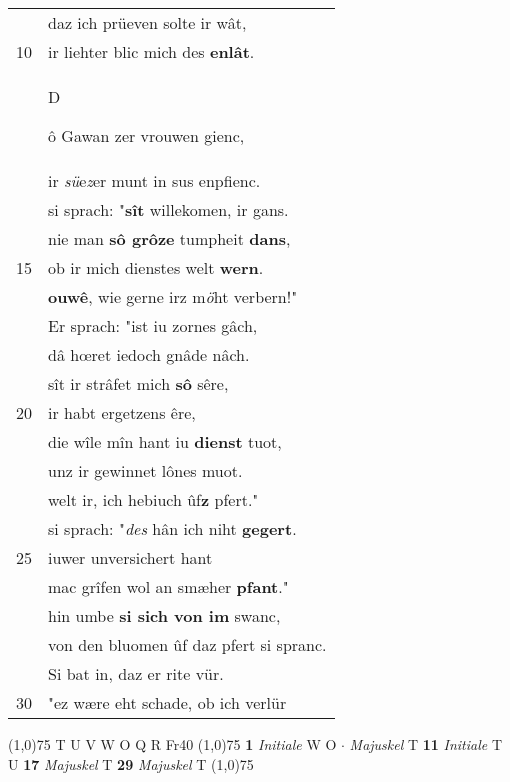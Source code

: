 \documentclass[8pt,a4paper,notitlepage]{article}
\begin{document}
\begin{table}[ht]
\begin{minipage}[t]{0.5\linewidth}
\begin{tabular}{rl}
 & daz ich prüeven solte ir wât,\\ 
10 & ir liehter blic mich des \textbf{enlât}.\\ 
 & \begin{large}D\end{large}ô Gawan zer vrouwen gienc,\\ 
 & ir \textit{sü}e\textit{z}er munt in sus enpfienc.\\ 
 & si sprach: "\textbf{sît} willekomen, ir gans.\\ 
 & nie man \textbf{sô grôze} tumpheit \textbf{dans},\\ 
15 & ob ir mich dienstes welt \textbf{wern}.\\ 
 & \textbf{ouwê}, wie gerne irz m\textit{ö}ht verbern!"\\ 
 & Er sprach: "ist iu zornes gâch,\\ 
 & dâ hœret iedoch gnâde nâch.\\ 
 & sît ir strâfet mich \textbf{sô} sêre,\\ 
20 & ir habt ergetzens êre,\\ 
 & die wîle mîn hant iu \textbf{dienst} tuot,\\ 
 & unz ir gewinnet lônes muot.\\ 
 & welt ir, ich hebiuch ûf\textbf{z} pfert."\\ 
 & si sprach: "\textit{des} hân ich niht \textbf{gegert}.\\ 
25 & iuwer unversichert hant\\ 
 & mac grîfen wol an smæher \textbf{pfant}."\\ 
 & hin umbe \textbf{si sich von im} swanc,\\ 
 & von den bluomen ûf daz pfert si spranc.\\ 
 & Si bat in, daz er rite vür.\\ 
30 & "ez wære eht schade, ob ich verlür\\ 
\end{tabular}
\scriptsize
\line(1,0){75} \newline
T U V W O Q R Fr40 \newline
\line(1,0){75} \newline
\textbf{1} \textit{Initiale} W O   $\cdot$ \textit{Majuskel} T  \textbf{11} \textit{Initiale} T U  \textbf{17} \textit{Majuskel} T  \textbf{29} \textit{Majuskel} T  \newline
\line(1,0){75} \newline

\end{minipage}
\end{table}
\end{document}
